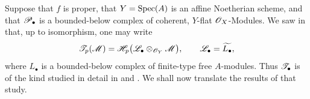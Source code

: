\begin{env}[7.7.4]
\label{III.7.7.4}
Suppose that $f$ is proper, that $Y=\operatorname{Spec}(A)$ is an affine
Noetherian scheme, and that $\mathscr{P}_\bullet$ is a
bounded-below complex of coherent, $Y$-flat
$\mathscr{O}_X$-Modules.  We saw in  that, up to
isomorphism, one may write
\[
  \mathscr{T}_p(\mathscr{M})
  =
  \mathscr{H}_p
    \bigl(\mathscr{L}_\bullet
      \otimes_{\mathscr{O}_Y}\mathscr{M}\bigr),
  \qquad
  \mathscr{L}_\bullet=\widetilde{L_\bullet},
\]
where $L_\bullet$ is a bounded-below complex of
finite-type free $A$-modules.  Thus
$\mathscr{T}_\bullet$ is of the kind studied in detail in
 and .  We shall now translate
the results of that study.
\end{env}

\ifdefined\EGAIIIStopAfterPageOneNineNine
  \expandafter\endinput
\fi

\egaIIISubsectionSevenSevenTheorems

